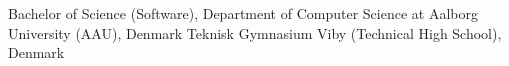 %
%
%


\begin{scholarship}
					{Bachelor of Science (Software), Department of Computer Science at Aalborg University (AAU), Denmark}
					{Teknisk Gymnasium Viby (Technical High School), Denmark}
\end{scholarship}\\\\\\\\\\\\\\\\